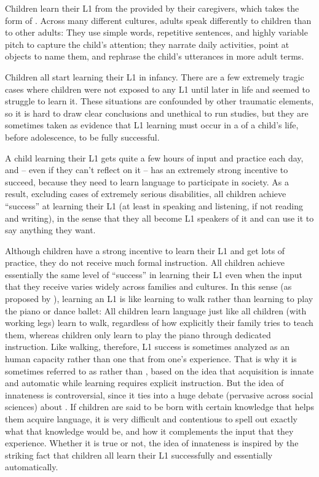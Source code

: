Children learn their L1 from the   provided by their caregivers, which takes the form of .  Across many different cultures, adults speak differently to children than to other adults: They use simple words, repetitive sentences, and highly variable pitch to capture the child's attention; they narrate daily activities, point at objects to name them, and rephrase the child's utterances in more adult terms. 

Children all start learning their L1 in infancy.  There are a few extremely tragic cases where children were not exposed to any L1 until later in life and seemed to struggle to learn it.  These situations are confounded by other traumatic elements, so it is hard to draw clear conclusions and unethical to run studies, but they are sometimes taken as evidence that L1 learning must occur in a  of a child's life, before adolescence, to be fully successful.


A child learning their L1 gets quite a few hours of input and practice each day, and -- even if they can't reflect on it -- has an extremely strong incentive to succeed, because they need to learn language to participate in society. As a result, excluding cases of extremely serious  disabilities, all children achieve ``success'' at learning their L1 (at least in speaking and listening, if not reading and writing), in the sense that they all become L1 speakers of it and can use it to say anything they want. 



Although children have a strong incentive to learn their L1 and get lots of practice, they do not receive much formal instruction. All children achieve essentially the same level of ``success'' in learning their L1 even when the input that they receive varies widely across families and cultures.   In this sense (as proposed by \citealt{Lenneberg:67}), learning an L1 is like learning to walk rather than learning to play the piano or dance ballet: All children learn language just like all children (with working legs) learn to walk, regardless of how explicitly their family tries to teach them, whereas children only learn to play the piano through dedicated instruction.  Like walking, therefore, L1 success is sometimes analyzed as an  human capacity rather than one that  from one's experience. That is why it is sometimes referred to as  rather than , based on the idea that acquisition is innate and automatic while learning requires explicit instruction.   But the idea of innateness is controversial, since it ties into a huge debate (pervasive across social sciences) about .
If children are said to be born with certain  knowledge that helps them acquire language, it is very difficult and contentious to spell out exactly what that knowledge would be, and how it complements the input  that they experience.  Whether it is true or not,  the idea of innateness  is inspired by the striking fact that children all learn their L1 successfully and essentially automatically.



